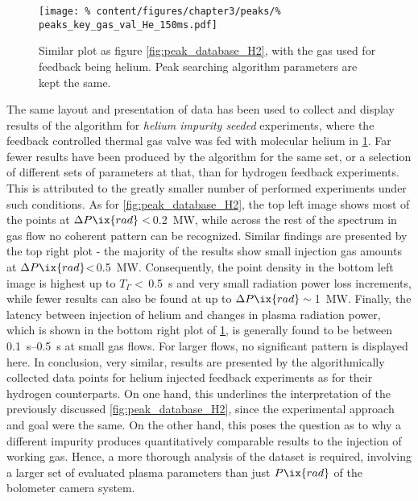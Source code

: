 %
        \begin{figure}[t]%
            \centering%
            \texttt{[image: \%
                content/figures/chapter3/peaks/\%
                peaks\_key\_gas\_val\_He\_150ms.pdf]}%
            \caption{Similar plot as figure \cref{fig:peak_database_H2}, with the gas used for feedback being helium. Peak searching algorithm parameters are kept the same.}\label{fig:peak_database_He}%
        \end{figure}%
%
        The same layout and presentation of data has been used to collect and display results of the algorithm for \textit{helium impurity seeded} experiments, where the feedback controlled thermal gas valve was fed with molecular helium in \cref{fig:peak_database_He}. Far fewer results have been produced by the algorithm for the same set, or a selection of different sets of parameters at that, than for hydrogen feedback experiments. This is attributed to the greatly smaller number of performed experiments under such conditions. As for \cref{fig:peak_database_H2}, the top left image shows most of the points at $\Delta P\ix{rad}<$\,\SI{0.2}{\mega\watt}, while across the rest of the spectrum in gas flow no coherent pattern can be recognized. Similar findings are presented by the top right plot - the majority of the results show small injection gas amounts at $\Delta P\ix{rad}$<\,\SI{0.5}{\mega\watt}. Consequently, the point density in the bottom left image is highest up to $T_{\Gamma}<$\,\SI{0.5}{\second} and very small radiation power loss increments, while fewer results can also be found at up to $\Delta P\ix{rad}\sim$\,\SI{1}{\mega\watt}. Finally, the latency between injection of helium and changes in plasma radiation power, which is shown in the bottom right plot of \cref{fig:peak_database_He}, is generally found to be between \SIrange{0.1}{0.5}{\second} at small gas flows. For larger flows, no significant pattern is displayed here. In conclusion, very similar, results are presented by the algorithmically collected data points for helium injected feedback experiments as for their hydrogen counterparts. On one hand, this underlines the interpretation of the previously discussed \cref{fig:peak_database_H2}, since the experimental approach and goal were the same. On the other hand, this poses the question as to why a different impurity produces quantitatively comparable results to the injection of working gas. Hence, a more thorough analysis of the dataset is required, involving a larger set of evaluated plasma parameters than just $P\ix{rad}$ of the bolometer camera system.\\%
